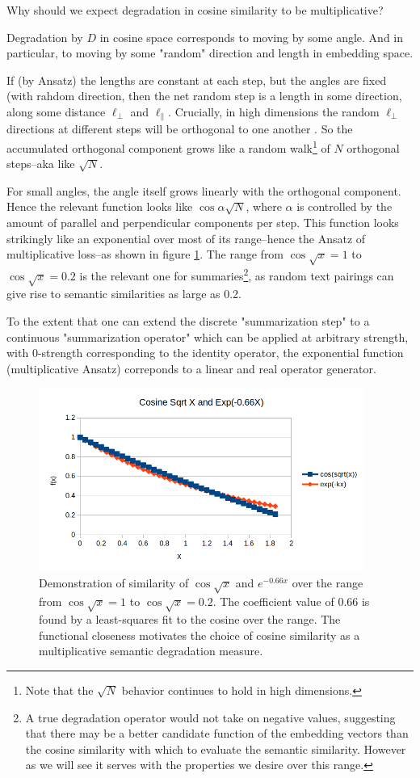 \documentclass{article}
\begin{document}
Why should we expect degradation in cosine similarity to be multiplicative?

Degradation by $D$ in cosine space corresponds to moving by some angle. 
And in particular, to moving by some "random" direction and length in embedding space.

If (by Ansatz) the lengths are constant at each step, but the angles are fixed (with rahdom direction, then the net random step is a length in some direction, along some distance $\ell_{\perp}$ and $\ell_{\parallel}$.
Crucially, in high dimensions the random $\ell_{\perp}$ directions at different steps will be orthogonal to one another \citep{randomwalk}. 
So the accumulated orthogonal component grows like a random walk\footnote{Note that the $\sqrt{N}$ behavior continues to hold in high dimensions.} of $N$ orthogonal steps--aka like $\sqrt{N}$.  

For small angles, the angle itself grows linearly with the orthogonal component.
Hence the relevant function looks like $\cos{\alpha \sqrt{N}}$, where $\alpha$ is controlled by the amount of parallel and perpendicular components per step.
This function looks strikingly like an exponential over most of its range--hence the Ansatz of multiplicative loss--as shown in figure \ref{fig:expcos}.
The range from $\cos \sqrt{x}=1$ to $\cos \sqrt{x} = 0.2$ is the relevant one for summaries\footnote{A true degradation operator would not take on negative values, suggesting that there may be a better candidate function of the embedding vectors than the cosine similarity with which to evaluate the semantic similarity.  However as we will see it serves with the properties we desire over this range.}, as random text pairings can give rise to semantic similarities as large as 0.2.

To the extent that one can extend the discrete "summarization step" to a continuous "summarization operator" which can be applied at arbitrary strength, with 0-strength corresponding to the identity operator, the exponential function (multiplicative Ansatz) correponds to a linear and real operator generator.

\begin{figure}
	\centering
    \includegraphics[height=6cm]{exp_cos.png}
	\caption{Demonstration of similarity of $\cos \sqrt{x} $ and $e^{-0.66x}$ over the range from $\cos \sqrt{x}=1$ to $\cos \sqrt{x} = 0.2$.  The coefficient value of 0.66 is found by a least-squares fit to the cosine over the range.  The functional closeness motivates the choice of cosine similarity as a multiplicative semantic degradation measure.}
	\label{fig:expcos}
\end{figure}
\end{document}
